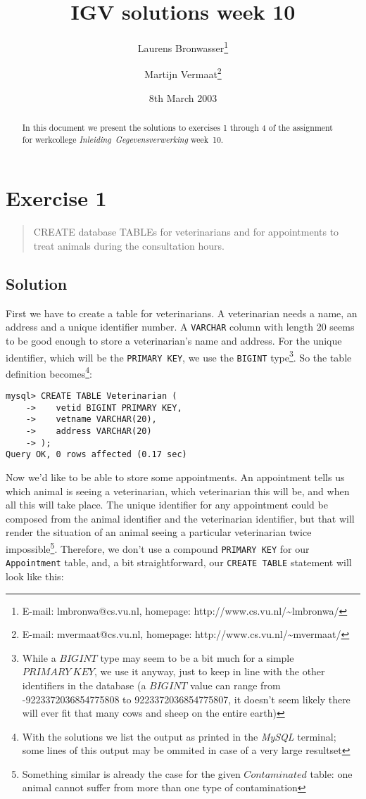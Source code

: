 \documentclass[11pt]{article}
\title{IGV solutions week 10}
\author{
	Laurens Bronwasser\footnote{E-mail: lmbronwa@cs.vu.nl, homepage: http://www.cs.vu.nl/\~{}lmbronwa/}
	\and
	Martijn Vermaat\footnote{E-mail: mvermaat@cs.vu.nl, homepage: http://www.cs.vu.nl/\~{}mvermaat/}
}
\date{8th March 2003}
\begin{document}
\maketitle

\begin{abstract}
In this document we present the solutions to exercises 1 through 4 of the assignment for werkcollege \emph{\mbox{Inleiding Gegevensverwerking}} \mbox{week 10}.
\end{abstract}

\tableofcontents


\newpage

\section{Exercise 1}

\begin{quote}
CREATE database TABLEs for veterinarians and for appointments to treat animals during the consultation hours.
\end{quote}

\subsection*{Solution}

First we have to create a table for veterinarians. A veterinarian needs a name, an address and a unique identifier number. A \verb|VARCHAR| column with length 20 seems to be good enough to store a veterinarian's name and address. For the unique identifier, which will be the \verb|PRIMARY KEY|, we use the \verb|BIGINT| type\footnote{While a $BIGINT$ type may seem to be a bit much for a simple $PRIMARY\ KEY$, we use it anyway, just to keep in line with the other identifiers in the database (a $BIGINT$ value can range from -9223372036854775808 to 9223372036854775807, it doesn't seem likely there will ever fit that many cows and sheep on the entire earth)}. So the table definition becomes\footnote{With the solutions we list the output as printed in the \emph{MySQL} terminal; some lines of this output may be ommited in case of a very large resultset}:

\begin{verbatim}
mysql> CREATE TABLE Veterinarian (
    ->    vetid BIGINT PRIMARY KEY,
    ->    vetname VARCHAR(20),
    ->    address VARCHAR(20)
    -> );
Query OK, 0 rows affected (0.17 sec)
\end{verbatim}

Now we'd like to be able to store some appointments. An appointment tells us which animal is seeing a veterinarian, which veterinarian this will be, and when all this will take place. The unique identifier for any appointment could be composed from the animal identifier and the veterinarian identifier, but that will render the situation of an animal seeing a particular veterinarian twice impossible\footnote{Something similar is already the case for the given $Contaminated$ table: one animal cannot suffer from more than one type of contamination}. Therefore, we don't use a compound \verb|PRIMARY KEY| for our \verb|Appointment| table, and, a bit straightforward, our \verb|CREATE TABLE| statement will look like this:
\end{document}
